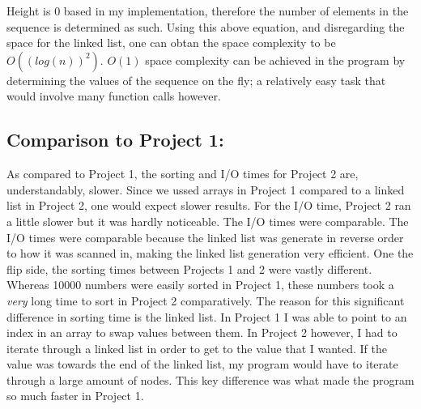 \documentclass[12pt]{article}
\begin{document}
\noindent Height is 0 based in my implementation, therefore the number of elements in the sequence is determined as such. Using this above equation, and disregarding the space for the linked list, one can obtan the space complexity to be $O((log(n))^2)$. $O(1)$ space complexity can be achieved in the program by determining the values of the sequence on the fly; a relatively easy task that would involve many function calls however.

\subsection*{Comparison to Project 1:}
As compared to Project 1, the sorting and I/O times for Project 2 are, understandably, slower. Since we ussed arrays in Project 1 compared to a linked list in Project 2, one would expect slower results. For the I/O time, Project 2 ran a little slower but it was hardly noticeable. The I/O times were comparable. The I/O times were comparable because the linked list was generate in reverse order to how it was scanned in, making the linked list generation very efficient. One the flip side, the sorting times between Projects 1 and 2 were vastly different. Whereas 10000 numbers were easily sorted in Project 1, these numbers took a \emph{very} long time to sort in Project 2 comparatively. The reason for this significant difference in sorting time is the linked list.  In Project 1 I was able to point to an index in an array to swap values between them. In Project 2 however, I had to iterate through a linked list in order to get to the value that I wanted. If the value was towards the end of the linked list, my program would have to iterate through a large amount of nodes. This key difference was what made the program so much faster in Project 1.
\end{document}
